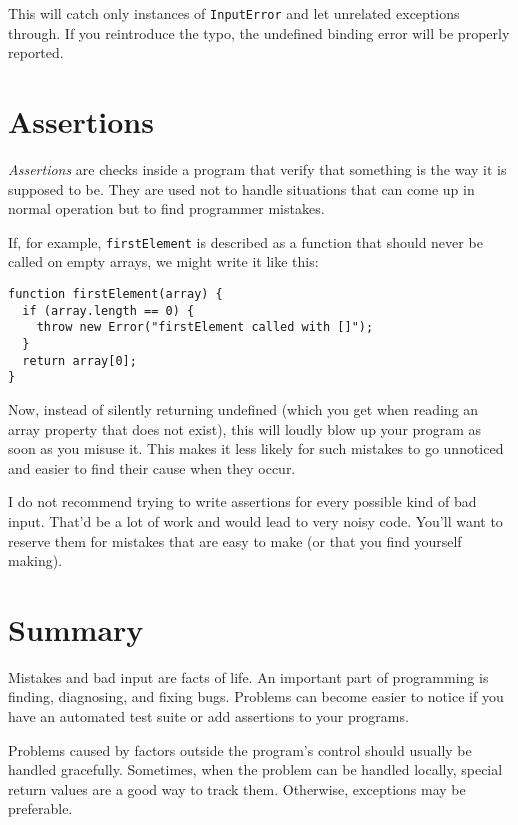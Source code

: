 This will catch only instances of \lstinline`InputError` and let unrelated exceptions through. If you reintroduce the typo, the undefined binding error will be properly reported.

\section{Assertions}

\emph{Assertions} are checks inside a program that verify that something is the way it is supposed to be. They are used not to handle situations that can come up in normal operation but to find programmer mistakes.

If, for example, \lstinline`firstElement` is described as a function that should never be called on empty arrays, we might write it like this:

\begin{lstlisting}
function firstElement(array) {
  if (array.length == 0) {
    throw new Error("firstElement called with []");
  }
  return array[0];
}
\end{lstlisting}
\noindent{}

Now, instead of silently returning undefined (which you get when reading an array property that does not exist), this will loudly blow up your program as soon as you misuse it. This makes it less likely for such mistakes to go unnoticed and easier to find their cause when they occur.

I do not recommend trying to write assertions for every possible kind of bad input. That'd be a lot of work and would lead to very noisy code. You'll want to reserve them for mistakes that are easy to make (or that you find yourself making).

\section{Summary}

Mistakes and bad input are facts of life. An important part of programming is finding, diagnosing, and fixing bugs. Problems can become easier to notice if you have an automated test suite or add assertions to your programs.

Problems caused by factors outside the program's control should usually be handled gracefully. Sometimes, when the problem can be handled locally, special return values are a good way to track them. Otherwise, exceptions may be preferable.

